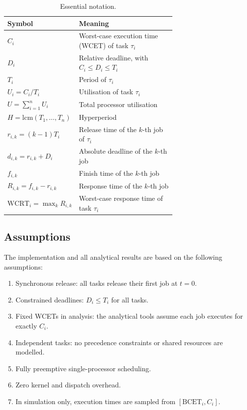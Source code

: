 \documentclass[11pt,a4paper]{article}
\begin{document}
\begin{table}[h]
\centering
\small
\begin{tabular}{|l|p{0.68\linewidth}|}
\hline
Symbol & Meaning \\
\hline
\(C_i\) & Worst-case execution time (WCET) of task \(\tau_i\) \\
\hline
\(D_i\) & Relative deadline, with \(C_i \leq D_i \leq T_i\) \\
\hline
\(T_i\) & Period of \(\tau_i\) \\
\hline
\(U_i = C_i/T_i\) & Utilisation of task \(\tau_i\) \\
\hline
\(U = \sum_{i=1}^{n} U_i\) & Total processor utilisation \\
\hline
\(H = \mathrm{lcm}(T_1,\ldots,T_n)\) & Hyperperiod \\
\hline
\(r_{i,k} = (k-1)T_i\) & Release time of the \(k\)-th job of \(\tau_i\) \\
\hline
\(d_{i,k} = r_{i,k} + D_i\) & Absolute deadline of the \(k\)-th job \\
\hline
\(f_{i,k}\) & Finish time of the \(k\)-th job \\
\hline
\(R_{i,k} = f_{i,k} - r_{i,k}\) & Response time of the \(k\)-th job \\
\hline
\(\mathrm{WCRT}_i = \max_k R_{i,k}\) & Worst-case response time of task \(\tau_i\) \\
\hline
\end{tabular}
\caption{Essential notation.}
\label{tab:notation}
\end{table}

\subsection{Assumptions}
The implementation and all analytical results are based on the following assumptions:
\begin{enumerate}
  \item Synchronous release: all tasks release their first job at \(t=0\).
  \item Constrained deadlines: \(D_i \leq T_i\) for all tasks.
  \item Fixed WCETs in analysis: the analytical tools assume each job executes for exactly \(C_i\).
  \item Independent tasks: no precedence constraints or shared resources are modelled.
  \item Fully preemptive single-processor scheduling.
  \item Zero kernel and dispatch overhead.
  \item In simulation only, execution times are sampled from \([\mathrm{BCET}_i, C_i]\).
\end{enumerate}
\end{document}
